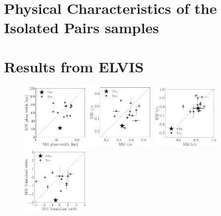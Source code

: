 \documentclass[a4paper,fleqn,usenatbib]{mnras}
\begin{document}

\newpage

\appendix

\section{Physical Characteristics of the Isolated Pairs samples}

\section{Results from ELVIS}
\begin{figure}
\centering
\includegraphics[width=0.30\textwidth]{scatter_ranked_elvis_width.pdf}
\includegraphics[width=0.30\textwidth]{scatter_ranked_elvis_ca_ratio.pdf}
\includegraphics[width=0.30\textwidth]{scatter_ranked_elvis_ba_ratio.pdf}
\includegraphics[width=0.30\textwidth]{scatter_norm_ranked_elvis_width.pdf}

\end{figure}
\end{document}
